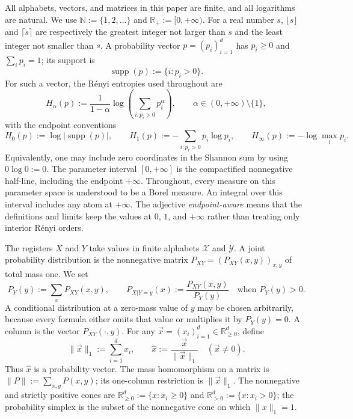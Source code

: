 \documentclass[aps,pra,11pt,onecolumn,nofootinbib,tightenlines]{revtex4-2}
\theoremstyle{definition}
\begin{document}
All alphabets, vectors, and matrices in this paper are finite, and all
logarithms are natural.  We use
$\mathbb N:=\{1,2,\ldots\}$ and
$\mathbb R_+:=[0,+\infty)$.  For a real number $s$,
$\lfloor s\rfloor$ and $\lceil s\rceil$ are respectively the greatest integer
not larger than $s$ and the least integer not smaller than $s$.  A probability vector
$p=(p_i)_{i=1}^d$ has $p_i\geq0$ and $\sum_i p_i=1$; its support is
\begin{equation}
 \operatorname{supp}(p):=\{i:p_i>0\}.
 \label{eq:vector-support-definition}
\end{equation}
For such a vector, the R\'enyi entropies used throughout are
\begin{equation}
 H_\alpha(p):=
 \frac{1}{1-\alpha}\log\!\left(\sum_{i:p_i>0}p_i^\alpha\right),
 \qquad \alpha\in(0,+\infty)\setminus\{1\},
 \label{eq:renyi-definition-standing}
\end{equation}
with the endpoint conventions
\begin{equation}
 H_0(p):=\log|\operatorname{supp}(p)|,
 \qquad
 H_1(p):=-\sum_{i:p_i>0}p_i\log p_i,
 \qquad
 H_\infty(p):=-\log\max_i p_i.
 \label{eq:renyi-endpoints-standing}
\end{equation}
Equivalently, one may include zero coordinates in the Shannon sum by using
$0\log0:=0$.  The parameter interval $[0,+\infty]$ is the compactified
nonnegative half-line, including the endpoint $+\infty$.  Throughout, every
measure on this parameter space is understood to be a Borel measure.  An
integral over this interval includes any atom at
$+\infty$.  The adjective \emph{endpoint-aware} means that the definitions and
limits keep the values at $0$, $1$, and $+\infty$ rather than treating only
interior R\'enyi orders.

The registers $X$ and $Y$ take values in finite alphabets $\mathcal X$ and
$\mathcal Y$.  A joint probability distribution is the nonnegative matrix
$P_{XY}=(P_{XY}(x,y))_{x,y}$ of total mass one.  We set
\begin{equation}
 P_Y(y):=\sum_xP_{XY}(x,y),
 \qquad
 P_{X|Y=y}(x):=\frac{P_{XY}(x,y)}{P_Y(y)}
 \quad\text{when }P_Y(y)>0.
 \label{eq:conditional-probability-standing}
\end{equation}
A conditional distribution at a zero-mass value of $y$ may be chosen
arbitrarily, because every formula either omits that value or multiplies it by
$P_Y(y)=0$.  A column is the vector $P_{XY}(\mathord\cdot,y)$.  For any
$\vec x=(x_i)_{i=1}^d\in\mathbb R^d_{\geq0}$, define
\begin{equation}
 \|\vec x\|_1:=\sum_{i=1}^d x_i,
 \qquad
 \widehat x:=\frac{\vec x}{\|\vec x\|_1}\quad(\vec x\neq0).
 \label{eq:l1-normalization-standing}
\end{equation}
Thus $\widehat x$ is a probability vector.  The mass homomorphism on a matrix is
$\|P\|:=\sum_{x,y}P(x,y)$; its one-column restriction is $\|\vec x\|_1$.
The nonnegative and strictly positive cones are
$\mathbb R^d_{\geq0}:=\{x:x_i\geq0\}$ and
$\mathbb R^d_{>0}:=\{x:x_i>0\}$; the probability simplex is the subset of the
nonnegative cone on which $\|x\|_1=1$.
\end{document}
